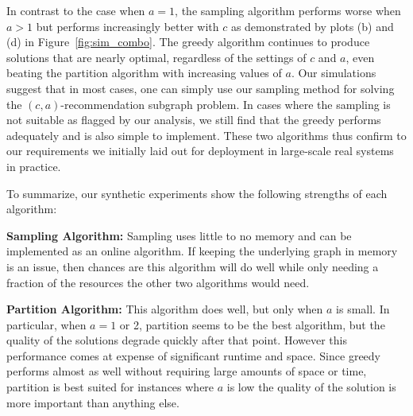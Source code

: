 In contrast to the case when $a=1$, the sampling algorithm
performs worse when $a>1$ but performs increasingly better with $c$ as
demonstrated by plots (b) and (d) in Figure~\ref{fig:sim_combo}. The greedy
algorithm continues to produce solutions that are nearly optimal,
regardless of the settings of $c$ and $a$, even beating the
partition algorithm with increasing values of $a$. Our simulations
suggest that in most cases, one can simply use our sampling method for
solving the $(c, a)$-recommendation subgraph problem. In cases where the sampling is not suitable as flagged
by our analysis, we still find that the greedy performs adequately and
is also simple to implement. These two algorithms thus confirm to our
requirements we initially laid out for deployment in large-scale real
systems in practice.



To summarize, our synthetic experiments show the following strengths of each algorithm: \vs

\textbf{Sampling Algorithm:} Sampling uses little to no memory and can
be implemented as an online algorithm. If keeping the underlying graph in
memory is an issue, then chances are this algorithm will do well while only needing
a fraction of the resources the other two algorithms would need. \vs

\textbf{Partition Algorithm:} This algorithm does well, but only when $a$ is small.
In particular, when $a=1$ or 2, partition seems to be the best algorithm, but the quality
of the solutions degrade quickly after that point. However this performance comes at
expense of significant runtime and space. Since greedy performs almost as well without
requiring large amounts of space or time, partition is best suited for instances where
$a$ is low the quality of the solution is more important than anything else. \vs

